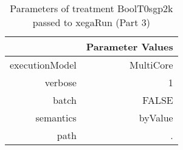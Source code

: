 \begin{table}[ht]
\centering
\begin{tabular}{rr}
  \hline
 & Parameter Values \\ 
  \hline
executionModel & MultiCore \\ 
  verbose & 1 \\ 
  batch & FALSE \\ 
  semantics & byValue \\ 
  path & . \\ 
   \hline
\end{tabular}
\caption{ Parameters of treatment BoolT0sgp2k passed to xegaRun
 (Part 3)} 
\end{table}
